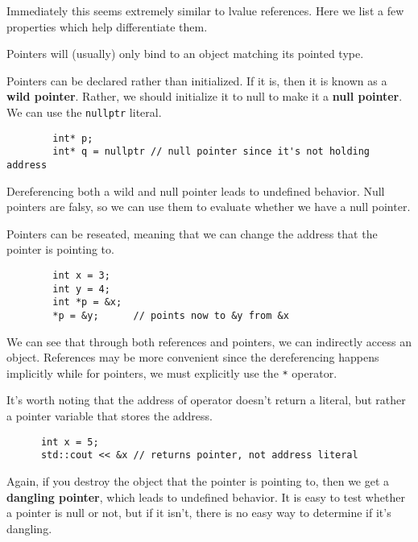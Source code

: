 \documentclass{article}
\begin{document}
    Immediately this seems extremely similar to lvalue references. Here we list a few properties which help differentiate them. 

    \begin{lemma}[Typechecking]
      Pointers will (usually) only bind to an object matching its pointed type. 
    \end{lemma}

    \begin{lemma}
      Pointers can be declared rather than initialized. If it is, then it is known as a \textbf{wild pointer}. Rather, we should initialize it to null to make it a \textbf{null pointer}. We can use the \texttt{nullptr} literal. 
      \begin{lstlisting}
        int* p; 
        int* q = nullptr // null pointer since it's not holding address
      \end{lstlisting}
      Dereferencing both a wild and null pointer leads to undefined behavior. Null pointers are falsy, so we can use them to evaluate whether we have a null pointer. 
    \end{lemma}

    \begin{lemma}
      Pointers can be reseated, meaning that we can change the address that the pointer is pointing to. 
      \begin{lstlisting}
        int x = 3; 
        int y = 4; 
        int *p = &x; 
        *p = &y;      // points now to &y from &x
      \end{lstlisting}
    \end{lemma} 

    We can see that through both references and pointers, we can indirectly access an object. References may be more convenient since the dereferencing happens implicitly while for pointers, we must explicitly use the \texttt{*} operator. 

    It's worth noting that the address of operator doesn't return a literal, but rather a pointer variable that stores the address. 
    \begin{lstlisting}
      int x = 5; 
      std::cout << &x // returns pointer, not address literal
    \end{lstlisting}

    Again, if you destroy the object that the pointer is pointing to, then we get a \textbf{dangling pointer}, which leads to undefined behavior. It is easy to test whether a pointer is null or not, but if it isn't, there is no easy way to determine if it's dangling. 
\end{document}
